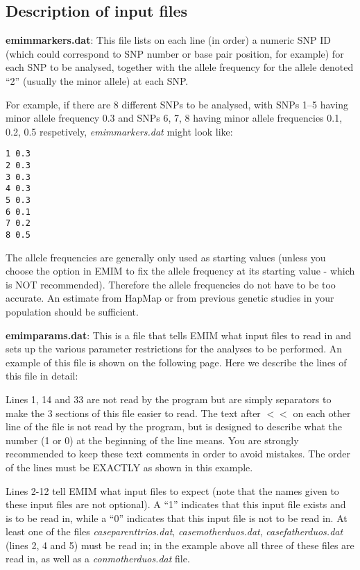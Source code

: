 \documentclass[a4paper,11pt]{report}
\begin{document}
\subsection*{Description of input files}

{\bf emimmarkers.dat}: This file lists on each line (in order) a numeric SNP ID (which could correspond to SNP number or base pair position, for example) for each SNP to be analysed, together with the allele frequency for the allele denoted ``2'' (usually the minor allele) at each SNP.

For example, if there are 8 different SNPs to be analysed, with SNPs 1--5 having minor allele frequency 0.3 and SNPs 6, 7, 8 having minor allele frequencies 0.1, 0.2, 0.5 respetively, {\it emimmarkers.dat} might look like:

\begin{verbatim}
1 0.3
2 0.3
3 0.3
4 0.3
5 0.3
6 0.1
7 0.2
8 0.5
\end{verbatim}

\newpage
The allele frequencies are generally only used as starting values (unless you choose the option in EMIM to fix the allele frequency at its starting value - which is NOT recommended). Therefore the allele frequencies do not have to be too accurate. An estimate from HapMap or from previous genetic studies in your population should be sufficient.

\vspace{0.5in}

{\bf emimparams.dat}: This is a file that tells EMIM what input files
to read in and sets up the various parameter restrictions for the analyses to be performed. An example of this file is shown on the following page. Here we describe the lines of this file in detail:


\vspace{0.3in}

Lines 1, 14 and 33 are not read by the program but are simply
separators to make the 3 sections of this file easier to read. The text after $<<$ on each other line of the file is not read by the program, but is designed to describe what the number (1 or 0) at the beginning of the line means. You are strongly recommended to keep these text comments in order to avoid mistakes. The order of the lines must be EXACTLY as shown in this example.

Lines 2-12 tell EMIM what input files to expect (note that the names given to these input files are not optional). A ``1'' indicates that this input file exists and is to be read in, while a ``0'' indicates that this input file is not to be read in. At least one of the files {\it caseparenttrios.dat}, {\it casemotherduos.dat}, {\it casefatherduos.dat} (lines 2, 4 and 5) must be read in; in the example above all three of these files are read in, as well as a {\it conmotherduos.dat} file.
\end{document}
